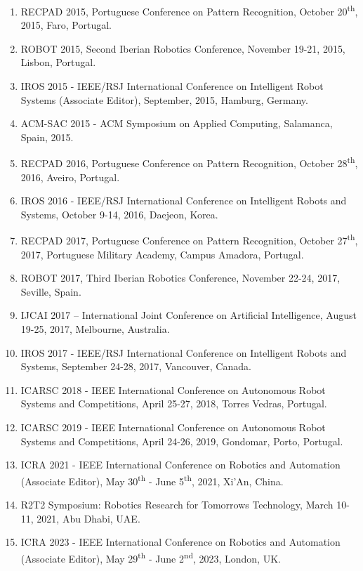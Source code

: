 \documentclass[
]{article}
\begin{document}
\begin{enumerate}
  VISART II Workshop @ ECCV 2014 - "Where Computer Vision Meets Art"
  Workshop, Zurich, Switzerland, September 2014.
\item
  RECPAD 2015, Portuguese Conference on Pattern Recognition, October
  20\textsuperscript{th}, 2015, Faro, Portugal.
\item
  ROBOT 2015, Second Iberian Robotics Conference, November 19-21, 2015,
  Lisbon, Portugal.
\item
  IROS 2015 - IEEE/RSJ International Conference on Intelligent Robot
  Systems (Associate Editor), September, 2015, Hamburg, Germany.
\item
  ACM-SAC 2015 - ACM Symposium on Applied Computing, Salamanca, Spain,
  2015.
\item
  RECPAD 2016, Portuguese Conference on Pattern Recognition, October
  28\textsuperscript{th}, 2016, Aveiro, Portugal.
\item
  IROS 2016 - IEEE/RSJ International Conference on Intelligent Robots
  and Systems, October 9-14, 2016, Daejeon, Korea.
\item
  RECPAD 2017, Portuguese Conference on Pattern Recognition, October
  27\textsuperscript{th}, 2017, Portuguese Military Academy, Campus
  Amadora, Portugal.
\item
  ROBOT 2017, Third Iberian Robotics Conference, November 22-24, 2017,
  Seville, Spain.
\item
  IJCAI 2017 -- International Joint Conference on Artificial
  Intelligence, August 19-25, 2017, Melbourne, Australia.
\item
  IROS 2017 - IEEE/RSJ International Conference on Intelligent Robots
  and Systems, September 24-28, 2017, Vancouver, Canada.
\item
  ICARSC 2018 - IEEE International Conference on Autonomous Robot
  Systems and Competitions, April 25-27, 2018, Torres Vedras, Portugal.
\item
  ICARSC 2019 - IEEE International Conference on Autonomous Robot
  Systems and Competitions, April 24-26, 2019, Gondomar, Porto,
  Portugal.
\item
  ICRA 2021 - IEEE International Conference on Robotics and Automation
  (Associate Editor), May 30\textsuperscript{th} - June
  5\textsuperscript{th}, 2021, Xi'An, China.
\item
  R2T2 Symposium: Robotics Research for Tomorrow\textquotesingle s
  Technology, March 10-11, 2021, Abu Dhabi, UAE.
\item
  ICRA 2023 - IEEE International Conference on Robotics and Automation
  (Associate Editor), May 29\textsuperscript{th} - June
  2\textsuperscript{nd}, 2023, London, UK.
\end{enumerate}
\end{document}

